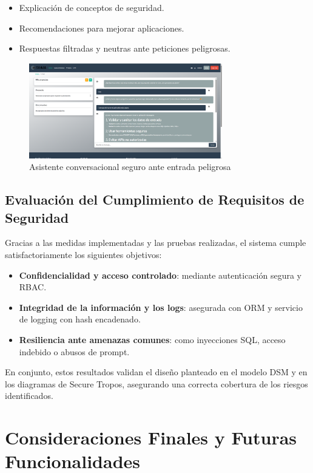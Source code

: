 \documentclass[11pt]{article}
\begin{document}
\begin{itemize}
    \item Explicación de conceptos de seguridad.
    \item Recomendaciones para mejorar aplicaciones.
    \item Respuestas filtradas y neutras ante peticiones peligrosas.
\end{itemize}

\begin{figure}[H]
    \centering
    \includegraphics[width=0.75\textwidth]{images/secure_chatbot_response.png}
    \caption{Asistente conversacional seguro ante entrada peligrosa}
\end{figure}

\subsection{Evaluación del Cumplimiento de Requisitos de Seguridad}

Gracias a las medidas implementadas y las pruebas realizadas, el sistema cumple satisfactoriamente los siguientes objetivos:

\begin{itemize}
    \item \textbf{Confidencialidad y acceso controlado}: mediante autenticación segura y RBAC.
    \item \textbf{Integridad de la información y los logs}: asegurada con ORM y servicio de logging con hash encadenado.
    \item \textbf{Resiliencia ante amenazas comunes}: como inyecciones SQL, acceso indebido o abusos de prompt.
\end{itemize}

En conjunto, estos resultados validan el diseño planteado en el modelo DSM y en los diagramas de Secure Tropos, asegurando una correcta cobertura de los riesgos identificados.

\section{Consideraciones Finales y Futuras Funcionalidades}
\end{document}
